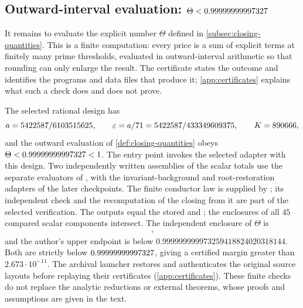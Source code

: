 \subsection{Outward-interval evaluation: \texorpdfstring{$\Theta<0.99999999997327$}{Theta<\PushTheta}}\label{subsec:closing-certificate}

It remains to evaluate the explicit number $\Theta$ defined in
\cref{subsec:closing-quantities}. This is a finite computation:
every price is a sum of explicit terms at finitely many prime
thresholds, evaluated in outward-interval arithmetic so that
rounding can only enlarge the result. The certificate states the
outcome and identifies the programs and data files that produce
it; \cref{app:certificates} explains what such a check does and
does not prove.

\begin{certificate}\label{cert:closing}
The selected rational design
 has
\[
 a=5422587/6103515625,\qquad \varepsilon=a/71=5422587/433349609375,\qquad K=890666,
\]
and the outward evaluation of \cref{def:closing-quantities} obeys
$\Theta<0.99999999997327<1$. The entry point
 invokes the selected adapter
 with this design.
Two independently written assemblies of the scalar totals use the
separate evaluators of , with the
invariant-background and root-restoration adapters of the later
checkpoints. The finite conductor law is supplied by
; its
independent check and the recomputation of the closing from it are
part of the selected verification. The outputs equal the stored
 and
; the enclosures of all $45$ compared scalar components intersect. The independent enclosure of $\Theta$ is
\begingroup\footnotesize
\begin{gather*}
 [0.99999999997325941882402031814341317621743080026301922476436792225715828504384175,\\
 0.99999999997325941882402031814341317621743080026301922476436792225715828504384968],
\end{gather*}
\endgroup
and the author's upper endpoint is below
$0.999999999973259418824020318144$.
Both are strictly below $0.99999999997327$, giving a certified margin greater than
$2.673\cdot10^{-11}$. The archival launcher  restores
and authenticates the original source layouts before replaying their
certificates (\cref{app:certificates}). These finite checks do not replace
the analytic reductions or external theorems, whose proofs and assumptions
are given in the text.
\end{certificate}

